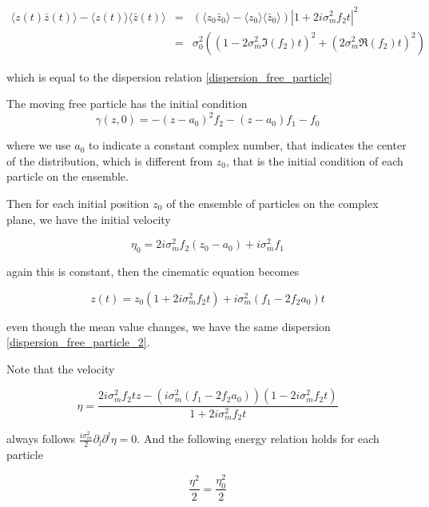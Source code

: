 \documentclass[a4paper,12pt]{article}
\begin{document}
\begin{eqnarray}
\langle z(t) \bar z(t) \rangle -  \langle z(t) \rangle \langle \bar z(t) \rangle  & = & 
(\langle z_0 \bar z_0 \rangle -  \langle z_0 \rangle \langle \bar z_0 \rangle)|1+2i\sigma_m^2f_2t|^2 \nonumber \\
& = & \sigma_0^2 \left( (1 - 2\sigma_m^2\Im(f_2)t)^2 + (2\sigma_m^2\Re(f_2)t)^2 \right) \label{dispersion_free_particle_2}
\end{eqnarray}

which is equal to the dispersion relation \ref{dispersion_free_particle}


The moving free particle has the initial condition 
\begin{equation}
\gamma(z,0) = -(z-a_0)^2 f_2 - (z-a_0) f_1 - f_0
\end{equation} 

where we use $a_0$ to indicate a constant complex number, that indicates the center of the distribution, which is different from $z_0$, that is the initial condition of each particle on the ensemble.

Then for each initial position $z_0$ of the ensemble of particles  on the complex plane, we have the initial velocity

\begin{equation}
\eta_0 = 2 i \sigma_m^2 f_2 (z_0 - a_0) + i \sigma_m^2 f_1
\end{equation}

again this is constant, then the cinematic equation becomes

\begin{equation}
z(t) = z_0(1+2i\sigma_m^2f_2t) + i\sigma_m^2(f_1 - 2f_2a_0)t
\end{equation}

even though the mean value changes, we have the same dispersion \ref{dispersion_free_particle_2}.

Note that the velocity

\begin{equation}
\eta = \frac{ 2i\sigma_m^2f_2t z - (i\sigma_m^2(f_1 - 2f_2a_0))(1-2i\sigma_m^2f_2t)  }{1+2i\sigma_m^2f_2t}
\end{equation}

always follows $\frac{i\sigma_m^2}{2 } \partial_l \partial^l \eta = 0$. And the following energy relation holds for each particle

\begin{equation}
\frac{\eta^2}{2} = \frac{\eta_0^2}{2}
\end{equation}
\end{document}
